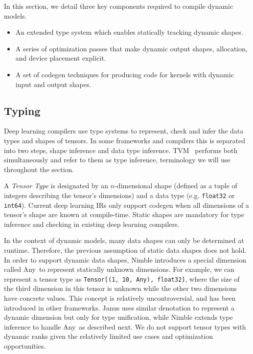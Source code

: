 In this section, we detail three key components required to compile dynamic models.

\begin{itemize}
    \item An extended type system which enables statically tracking dynamic shapes.
    \item A series of optimization passes that make dynamic output shapes, allocation, and device placement explicit.
    \item A set of codegen techniques for producing code for kernels with dynamic input and output shapes.
\end{itemize}

\subsection{Typing}
\label{sec:compliation:typing}
Deep learning compilers use type systems to represent, check and infer the data types and shapes of tensors. In some frameworks and compilers this is separated into two steps, shape inference and data type inference. TVM~\citep{roesch2019relay} performs both simultaneously and refer to them as type inference, terminology we will use throughout the section.

A {\em Tensor Type} is designated by an $n$-dimensional shape (defined as a tuple of integers describing the tensor's dimensions) and a data type (e.g. \texttt{float32} or \texttt{int64}).
Current deep learning IRs only support codegen when all dimensions of a tensor's shape are known at compile-time.
Static shapes are mandatory for type inference and checking in existing deep learning compilers.

In the context of dynamic models, many data shapes can only be determined at runtime. Therefore, the previous assumption of static data shapes does not hold.
In order to support dynamic data shapes, Nimble introduces a special dimension called Any~to represent statically unknown dimensions.
For example, we can represent a tensor type as \texttt{Tensor[(1, 10, Any), float32]},
where the size of the third dimension in this tensor is unknown while the other
two dimensions have concrete values.
This concept is relatively uncontroversial, and has been introduced in other frameworks.
Janus \citep{jeong2019janus} uses similar denotation to represent a dynamic dimension but only for type unification, while Nimble extends type inference to handle Any~as described next. We do not support tensor types with dynamic ranks given the relatively limited use cases and optimization opportunities.

